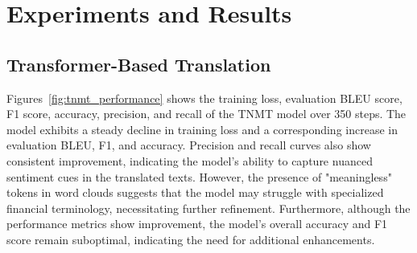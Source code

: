 \documentclass[12pt]{article}
\begin{document}
\section{Experiments and Results}
\label{sec:results}

\subsection{Transformer-Based Translation}
Figures~\ref{fig:tnmt_performance} shows the training loss, evaluation BLEU score, F1 score, accuracy, precision, and recall of the TNMT model over 350 steps. The model exhibits a steady decline in training loss and a corresponding increase in evaluation BLEU, F1, and accuracy. Precision and recall curves also show consistent improvement, indicating the model's ability to capture nuanced sentiment cues in the translated texts. However, the presence of "meaningless" tokens in word clouds suggests that the model may struggle with specialized financial terminology, necessitating further refinement. Furthermore, although the performance metrics show improvement, the model's overall accuracy and F1 score remain suboptimal, indicating the need for additional enhancements.
\end{document}
